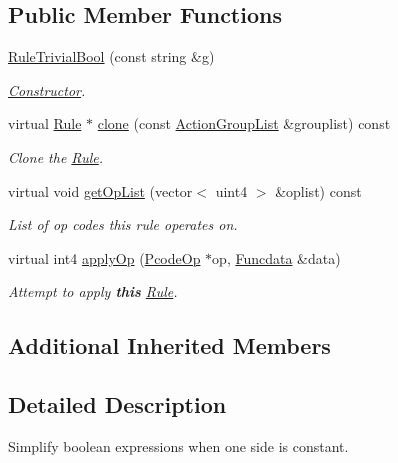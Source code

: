 \subsection*{Public Member Functions}
\begin{DoxyCompactItemize}
\item 
\mbox{\hyperlink{class_rule_trivial_bool_a8a079f95121a49bd16ee55cc618c0a07}{Rule\+Trivial\+Bool}} (const string \&g)
\begin{DoxyCompactList}\small\item\em \mbox{\hyperlink{class_constructor}{Constructor}}. \end{DoxyCompactList}\item 
virtual \mbox{\hyperlink{class_rule}{Rule}} $\ast$ \mbox{\hyperlink{class_rule_trivial_bool_a889c0573c7bc1c1d231ec03bd58a13c0}{clone}} (const \mbox{\hyperlink{class_action_group_list}{Action\+Group\+List}} \&grouplist) const
\begin{DoxyCompactList}\small\item\em Clone the \mbox{\hyperlink{class_rule}{Rule}}. \end{DoxyCompactList}\item 
virtual void \mbox{\hyperlink{class_rule_trivial_bool_acdd8aeb672d69e778194b2cc750ba143}{get\+Op\+List}} (vector$<$ uint4 $>$ \&oplist) const
\begin{DoxyCompactList}\small\item\em List of op codes this rule operates on. \end{DoxyCompactList}\item 
virtual int4 \mbox{\hyperlink{class_rule_trivial_bool_a0254986d799ca6fd09ecb6e96288eae1}{apply\+Op}} (\mbox{\hyperlink{class_pcode_op}{Pcode\+Op}} $\ast$op, \mbox{\hyperlink{class_funcdata}{Funcdata}} \&data)
\begin{DoxyCompactList}\small\item\em Attempt to apply {\bfseries{this}} \mbox{\hyperlink{class_rule}{Rule}}. \end{DoxyCompactList}\end{DoxyCompactItemize}
\subsection*{Additional Inherited Members}


\subsection{Detailed Description}
Simplify boolean expressions when one side is constant. 



